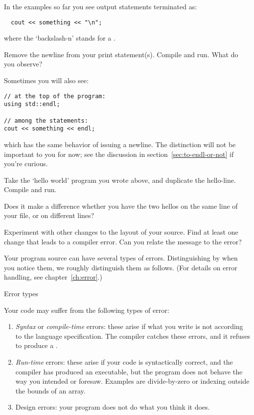 In the examples so far you see output statements terminated as:
\begin{lstlisting}
  cout << something << "\n";
\end{lstlisting}
where the `backslash-n' stands for a .

\begin{exercise}
  Remove the newline from your print statement(s).
  Compile and run. What do you observe?
\end{exercise}

Sometimes you will also see:
\begin{lstlisting}
// at the top of the program:
using std::endl;

// among the statements:
cout << something << endl;
\end{lstlisting}
which has the same behavior of issuing a newline.
The distinction will not be important to you for now;
see the discussion in section~\ref{sec:to-endl-or-not}
if you're curious.

\begin{exercise}
  \label{ex:hello-line}
  Take the `hello world' program you wrote above, and duplicate the
  hello-line. Compile and run.

  Does it make a difference whether you have the two hellos on the
  same line of your file, or on different lines?

  Experiment with other changes to the layout of your source. Find at
  least one change that leads to a compiler error. Can you relate the
  message to the error?
\end{exercise}

Your program source can have several types of errors.
Distinguishing by when you notice them, we roughly distinguish them
as follows.
(For details on error handling, see chapter~\ref{ch:error}.)

\begin{block}{Error types}
  \label{sl:program-errors}
\begin{slideonly}
Your code may suffer from the following types of error:    
\end{slideonly}
  \begin{enumerate}
  \item \emph{Syntax} or
    \emph{compile-time} errors: these arise
    if what you write is not according to the language specification.
    The compiler catches these errors, and it refuses to produce a
    .
  \item \emph{Run-time} errors: these arise if
    your code is syntactically correct, and the compiler has produced
    an executable, but the program does not behave the way you
    intended or foresaw. Examples are divide-by-zero or indexing
    outside the bounds of an array.
  \item Design errors: your program does not do what you think it does.
  \end{enumerate}
\end{block}

